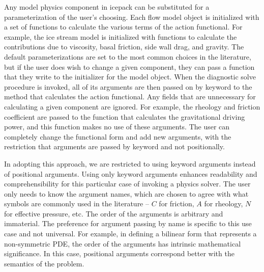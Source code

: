 \documentclass{article}
\theoremstyle{definition}
\theoremstyle{plain}
\begin{document}
Any model physics component in icepack can be substituted for a parameterization of the user's choosing.
Each flow model object is initialized with a set of functions to calculate the various terms of the action functional.
For example, the ice stream model is initialized with functions to calculate the contributions due to viscosity, basal friction, side wall drag, and gravity.
The default parameterizations are set to the most common choices in the literature, but if the user does wish to change a given component, they can pass a function that they write to the initializer for the model object.
When the diagnostic solve procedure is invoked, all of its arguments are then passed on by keyword to the method that calculates the action functional.
Any fields that are unnecessary for calculating a given component are ignored.
For example, the rheology and friction coefficient are passed to the function that calculates the gravitational driving power, and this function makes no use of these arguments.
The user can completely change the functional form and add new arguments, with the restriction that arguments are passed by keyword and not positionally.

In adopting this approach, we are restricted to using keyword arguments instead of positional arguments.
Using only keyword arguments enhances readability and comprehensibility for this particular case of invoking a physics solver.
The user only needs to know the argument names, which are chosen to agree with what symbols are commonly used in the literature -- $C$ for friction, $A$ for rheology, $N$ for effective pressure, etc.
The order of the arguments is arbitrary and immaterial.
The preference for argument passing by name is specific to this use case and not universal.
For example, in defining a bilinear form that represents a non-symmetric PDE, the order of the arguments has intrinsic mathematical significance.
In this case, positional arguments correspond better with the semantics of the problem.
\end{document}
